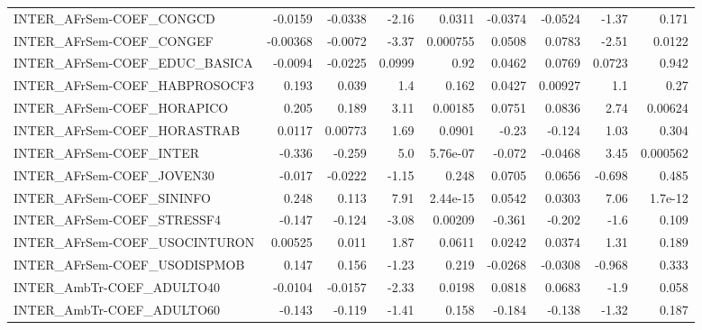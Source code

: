 \begin{tabular}{lrrrrrrrr}
INTER\_AFrSem-COEF\_CONGCD               &     -0.0159 &      -0.0338 &   -2.16 &   0.0311 &    -0.0374 &     -0.0524 &        -1.37 &         0.171 \\
INTER\_AFrSem-COEF\_CONGEF               &    -0.00368 &      -0.0072 &   -3.37 & 0.000755 &     0.0508 &      0.0783 &        -2.51 &        0.0122 \\
INTER\_AFrSem-COEF\_EDUC\_BASICA          &     -0.0094 &      -0.0225 &  0.0999 &     0.92 &     0.0462 &      0.0769 &       0.0723 &         0.942 \\
INTER\_AFrSem-COEF\_HABPROSOCF3          &       0.193 &        0.039 &     1.4 &    0.162 &     0.0427 &     0.00927 &          1.1 &          0.27 \\
INTER\_AFrSem-COEF\_HORAPICO             &       0.205 &        0.189 &    3.11 &  0.00185 &     0.0751 &      0.0836 &         2.74 &       0.00624 \\
INTER\_AFrSem-COEF\_HORASTRAB            &      0.0117 &      0.00773 &    1.69 &   0.0901 &      -0.23 &      -0.124 &         1.03 &         0.304 \\
INTER\_AFrSem-COEF\_INTER                &      -0.336 &       -0.259 &     5.0 & 5.76e-07 &     -0.072 &     -0.0468 &         3.45 &      0.000562 \\
INTER\_AFrSem-COEF\_JOVEN30              &      -0.017 &      -0.0222 &   -1.15 &    0.248 &     0.0705 &      0.0656 &       -0.698 &         0.485 \\
INTER\_AFrSem-COEF\_SININFO              &       0.248 &        0.113 &    7.91 & 2.44e-15 &     0.0542 &      0.0303 &         7.06 &       1.7e-12 \\
INTER\_AFrSem-COEF\_STRESSF4             &      -0.147 &       -0.124 &   -3.08 &  0.00209 &     -0.361 &      -0.202 &         -1.6 &         0.109 \\
INTER\_AFrSem-COEF\_USOCINTURON          &     0.00525 &        0.011 &    1.87 &   0.0611 &     0.0242 &      0.0374 &         1.31 &         0.189 \\
INTER\_AFrSem-COEF\_USODISPMOB           &       0.147 &        0.156 &   -1.23 &    0.219 &    -0.0268 &     -0.0308 &       -0.968 &         0.333 \\
INTER\_AmbTr-COEF\_ADULTO40              &     -0.0104 &      -0.0157 &   -2.33 &   0.0198 &     0.0818 &      0.0683 &         -1.9 &         0.058 \\
INTER\_AmbTr-COEF\_ADULTO60              &      -0.143 &       -0.119 &   -1.41 &    0.158 &     -0.184 &      -0.138 &        -1.32 &         0.187 \\

\end{tabular}
